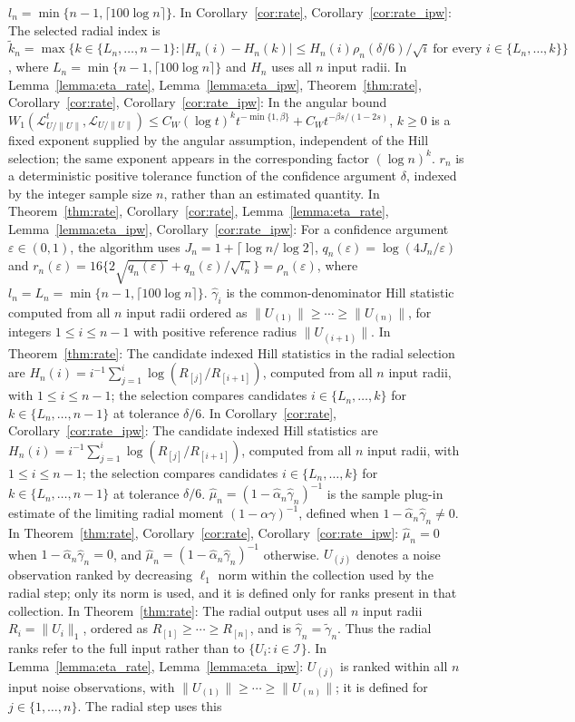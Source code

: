 \documentclass[12pt]{article}
\theoremstyle{plain}
\theoremstyle{definition}
\begin{document}
$l_n=\min\{n-1,\lceil100\log n\rceil\}$. In Corollary~\ref{cor:rate}, Corollary~\ref{cor:rate_ipw}: The selected radial index is $\widetilde k_n=\max\{k\in\{L_n,\ldots,n-1\}:|H_n(i)-H_n(k)|\leq H_n(i)\rho_n(\delta/6)/\sqrt i\ \text{for every }i\in\{L_n,\ldots,k\}\}$, where $L_n=\min\{n-1,\lceil100\log n\rceil\}$ and $H_n$ uses all $n$ input radii. In Lemma~\ref{lemma:eta_rate}, Lemma~\ref{lemma:eta_ipw}, Theorem~\ref{thm:rate}, Corollary~\ref{cor:rate}, Corollary~\ref{cor:rate_ipw}: In the angular bound $W_1(\mathcal L_{U/\|U\|}^t,\mathcal L_{U/\|U\|})\leq C_W(\log t)^k t^{-\min\{1,\beta\}}+C_Wt^{-\beta s/(1-2s)}$, $k\geq0$ is a fixed exponent supplied by the angular assumption, independent of the Hill selection; the same exponent appears in the corresponding factor $(\log n)^k$. $r_n$ is a deterministic positive tolerance function of the confidence argument $\delta$, indexed by the integer sample size $n$, rather than an estimated quantity. In Theorem~\ref{thm:rate}, Corollary~\ref{cor:rate}, Lemma~\ref{lemma:eta_rate}, Lemma~\ref{lemma:eta_ipw}, Corollary~\ref{cor:rate_ipw}: For a confidence argument $\varepsilon\in(0,1)$, the algorithm uses $J_n=1+\lceil\log n/\log2\rceil$, $q_n(\varepsilon)=\log(4J_n/\varepsilon)$ and $r_n(\varepsilon)=16\{2\sqrt{q_n(\varepsilon)}+q_n(\varepsilon)/\sqrt{l_n}\}=\rho_n(\varepsilon)$, where $l_n=L_n=\min\{n-1,\lceil100\log n\rceil\}$. $\hat\gamma_i$ is the common-denominator Hill statistic computed from all $n$ input radii ordered as $\|U_{(1)}\|\geq\cdots\geq\|U_{(n)}\|$, for integers $1\leq i\leq n-1$ with positive reference radius $\|U_{(i+1)}\|$. In Theorem~\ref{thm:rate}: The candidate indexed Hill statistics in the radial selection are $H_n(i)=i^{-1}\sum_{j=1}^i\log(R_{[j]}/R_{[i+1]})$, computed from all $n$ input radii, with $1\leq i\leq n-1$; the selection compares candidates $i\in\{L_n,\ldots,k\}$ for $k\in\{L_n,\ldots,n-1\}$ at tolerance $\delta/6$. In Corollary~\ref{cor:rate}, Corollary~\ref{cor:rate_ipw}: The candidate indexed Hill statistics are $H_n(i)=i^{-1}\sum_{j=1}^i\log(R_{[j]}/R_{[i+1]})$, computed from all $n$ input radii, with $1\leq i\leq n-1$; the selection compares candidates $i\in\{L_n,\ldots,k\}$ for $k\in\{L_n,\ldots,n-1\}$ at tolerance $\delta/6$. $\hat{\mu}_n=(1-\hat{\alpha}_n\hat{\gamma}_n)^{-1}$ is the sample plug-in estimate of the limiting radial moment $(1-\alpha\gamma)^{-1}$, defined when $1-\hat{\alpha}_n\hat{\gamma}_n\ne0$. In Theorem~\ref{thm:rate}, Corollary~\ref{cor:rate}, Corollary~\ref{cor:rate_ipw}: $\hat\mu_n=0$ when $1-\hat\alpha_n\hat\gamma_n=0$, and $\hat\mu_n=(1-\hat\alpha_n\hat\gamma_n)^{-1}$ otherwise. $U_{(j)}$ denotes a noise observation ranked by decreasing $\ell_1$ norm within the collection used by the radial step; only its norm is used, and it is defined only for ranks present in that collection. In Theorem~\ref{thm:rate}: The radial output uses all $n$ input radii $R_i=\|U_i\|_1$, ordered as $R_{[1]}\geq\cdots\geq R_{[n]}$, and is $\hat\gamma_n=\widetilde\gamma_n$. Thus the radial ranks refer to the full input rather than to $\{U_i:i\in\mathcal I\}$. In Lemma~\ref{lemma:eta_rate}, Lemma~\ref{lemma:eta_ipw}: $U_{(j)}$ is ranked within all $n$ input noise observations, with $\|U_{(1)}\|\geq\cdots\geq\|U_{(n)}\|$; it is defined for $j\in\{1,\ldots,n\}$. The radial step uses this 
\end{document}
